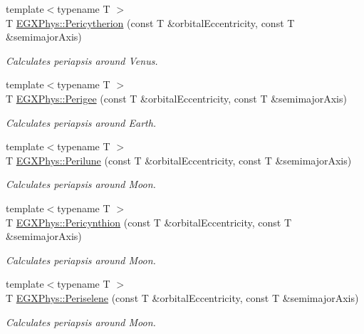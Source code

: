 \begin{DoxyCompactItemize}
{\footnotesize template$<$typename T $>$ }\\T \mbox{\hyperlink{group___e_g_x_phys-_periapsis_gaa270e364cbbd7d3d6212872df484926f}{E\+G\+X\+Phys\+::\+Pericytherion}} (const T \&orbital\+Eccentricity, const T \&semimajor\+Axis)
\begin{DoxyCompactList}\small\item\em Calculates periapsis around Venus. \end{DoxyCompactList}\item 
{\footnotesize template$<$typename T $>$ }\\T \mbox{\hyperlink{group___e_g_x_phys-_periapsis_gae2d053caf69cb0b4c3207064a2ab143a}{E\+G\+X\+Phys\+::\+Perigee}} (const T \&orbital\+Eccentricity, const T \&semimajor\+Axis)
\begin{DoxyCompactList}\small\item\em Calculates periapsis around Earth. \end{DoxyCompactList}\item 
{\footnotesize template$<$typename T $>$ }\\T \mbox{\hyperlink{group___e_g_x_phys-_periapsis_ga2cc7ab05e18d32c94d8d74972e032793}{E\+G\+X\+Phys\+::\+Perilune}} (const T \&orbital\+Eccentricity, const T \&semimajor\+Axis)
\begin{DoxyCompactList}\small\item\em Calculates periapsis around Moon. \end{DoxyCompactList}\item 
{\footnotesize template$<$typename T $>$ }\\T \mbox{\hyperlink{group___e_g_x_phys-_periapsis_gaeeba153b188cd06cbd233eaef12f0a6a}{E\+G\+X\+Phys\+::\+Pericynthion}} (const T \&orbital\+Eccentricity, const T \&semimajor\+Axis)
\begin{DoxyCompactList}\small\item\em Calculates periapsis around Moon. \end{DoxyCompactList}\item 
{\footnotesize template$<$typename T $>$ }\\T \mbox{\hyperlink{group___e_g_x_phys-_periapsis_ga255874374dde571531e443cdbef9ef0c}{E\+G\+X\+Phys\+::\+Periselene}} (const T \&orbital\+Eccentricity, const T \&semimajor\+Axis)
\begin{DoxyCompactList}\small\item\em Calculates periapsis around Moon. \end{DoxyCompactList}\item 

\end{DoxyCompactItemize}
